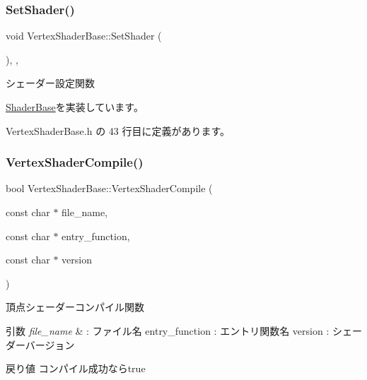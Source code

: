 \mbox{\label{class_vertex_shader_base_a9f93697c5668852850f0a7b7ef7cb67f}} 
\subsubsection{\texorpdfstring{Set\+Shader()}{SetShader()}}
{\footnotesize\ttfamily void Vertex\+Shader\+Base\+::\+Set\+Shader (\begin{DoxyParamCaption}{ }\end{DoxyParamCaption})\hspace{0.3cm}{\ttfamily [inline]}, {\ttfamily [override]}, {\ttfamily [virtual]}}



シェーダー設定関数 



\mbox{\hyperlink{class_shader_base_af45063254b80602db8626360d643baee}{Shader\+Base}}を実装しています。



 Vertex\+Shader\+Base.\+h の 43 行目に定義があります。

\mbox{\label{class_vertex_shader_base_a6565abadb8ac173d3273ab1698d31c6c}} 
\subsubsection{\texorpdfstring{Vertex\+Shader\+Compile()}{VertexShaderCompile()}}
{\footnotesize\ttfamily bool Vertex\+Shader\+Base\+::\+Vertex\+Shader\+Compile (\begin{DoxyParamCaption}\item[{const char $\ast$}]{file\+\_\+name,  }\item[{const char $\ast$}]{entry\+\_\+function,  }\item[{const char $\ast$}]{version }\end{DoxyParamCaption})\hspace{0.3cm}{\ttfamily [inline]}}



頂点シェーダーコンパイル関数 


\begin{DoxyParams}{引数}
{\em file\+\_\+name} & \+: ファイル名 entry\+\_\+function \+: エントリ関数名 version \+: シェーダーバージョン \\
\hline
\end{DoxyParams}
\begin{DoxyReturn}{戻り値}
コンパイル成功ならtrue 
\end{DoxyReturn}


